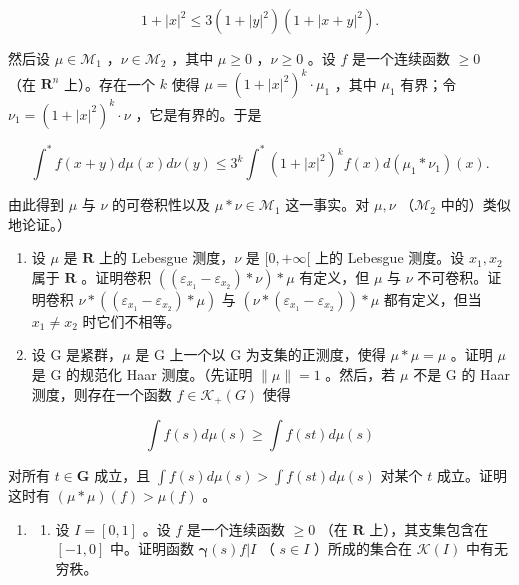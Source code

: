 \[
1 + | x | ^ {2} \leqslant 3 (1 + | y | ^ {2}) (1 + | x + y | ^ {2}).
\]

然后设 \(\mu \in \mathcal{M}_1\) ，\(\nu \in \mathcal{M}_2\) ，其中 \(\mu \geqslant 0\) ，\(\nu \geqslant 0\) 。设 \(f\) 是一个连续函数 \(\geqslant 0\) （在 \(\mathbf{R}^n\) 上）。存在一个 \(k\) 使得 \(\mu = (1 + |x|^2)^k \cdot \mu_1\) ，其中 \(\mu_1\) 有界；令 \(\nu_1 = (1 + |x|^2)^k \cdot \nu\) ，它是有界的。于是

\[
\int^ {*} f (x + y) d \mu (x) d \nu (y) \leqslant 3 ^ {k} \int^ {*} (1 + | x | ^ {2}) ^ {k} f (x) d (\mu_ {1} * \nu_ {1}) (x).
\]

由此得到 \(\mu\) 与 \(\nu\) 的可卷积性以及 \(\mu * \nu \in \mathcal{M}_1\) 这一事实。对 \(\mu, \nu\) （\(\mathcal{M}_2\) 中的）类似地论证。）

\begin{enumerate}
\def\labelenumi{\arabic{enumi})}
\setcounter{enumi}{3}
\item
  设 \(\mu\) 是 \(\mathbf{R}\) 上的 Lebesgue 测度，\(\nu\) 是 \([0, +\infty[\) 上的 Lebesgue 测度。设 \(x_1, x_2\) 属于 \(\mathbf{R}\) 。证明卷积 \(((\varepsilon_{x_1} - \varepsilon_{x_2}) * \nu) * \mu\) 有定义，但 \(\mu\) 与 \(\nu\) 不可卷积。证明卷积 \(\nu * ((\varepsilon_{x_1} - \varepsilon_{x_2}) * \mu)\) 与 \((\nu * (\varepsilon_{x_1} - \varepsilon_{x_2})) * \mu\) 都有定义，但当 \(x_1 \neq x_2\) 时它们不相等。
\item
  设 G 是紧群，\(\mu\) 是 G 上一个以 G 为支集的正测度，使得 \(\mu*\mu=\mu\) 。证明 \(\mu\) 是 G 的规范化 Haar 测度。（先证明 \(\|\mu\|=1\) 。然后，若 \(\mu\) 不是 G 的 Haar 测度，则存在一个函数 \(f\in\mathcal{K}_{+}(G)\) 使得
\end{enumerate}

\[
\int f (s) d \mu (s) \geqslant \int f (s t) d \mu (s)
\]

对所有 \(t \in \mathbf{G}\) 成立，且 \(\int f(s) d\mu(s) > \int f(st) d\mu(s)\) 对某个 \(t\) 成立。证明这时有 \((\mu * \mu)(f) > \mu(f)\) 。

\begin{enumerate}
\def\labelenumi{\arabic{enumi})}
\setcounter{enumi}{5}
\tightlist
\item
  \begin{enumerate}
  \def\labelenumii{\alph{enumii})}
  \tightlist
  \item
    设 \(I = [0,1]\) 。设 \(f\) 是一个连续函数 \(\geqslant 0\) （在 \(\mathbf{R}\) 上），其支集包含在 \([-1,0]\) 中。证明函数 \(\pmb{\gamma}(s)f|I\) （ \(s \in I\) ）所成的集合在 \(\mathcal{K}(I)\) 中有无穷秩。
  \end{enumerate}
\end{enumerate}


